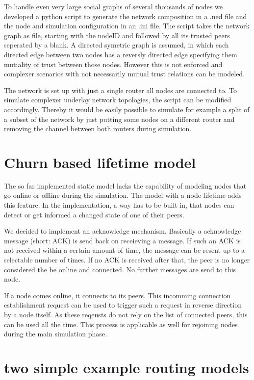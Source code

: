 To handle even very large social graphs of several thousands of nodes we developed a python script to generate the network composition in a .ned file and the node and simulation configuration in an .ini file. The script takes the network graph as file, starting with the nodeID and followed by all its trusted peers seperated by a blank. A directed symetric graph is assumed, in which each directed edge between two nodes has a reversly directed edge specifying them mutiality of trust between those nodes. However this is not enforced and complexer scenarios with not necessarily mutual trust relations can be modeled.

The network is set up with just a single router all nodes are connected to. To simulate complexer underlay network topologies, the script can be modified accordingly. Thereby it would be easily possible to simulate for example a split of a subset of the network by just putting some nodes on a different router and removing the channel between both routers during simulation.

\section{Churn based lifetime model}

The so far implemented static model lacks the capability of modeling nodes that go online or offline during the simulation. The model with a node lifetime adds this feature. In the implementation, a way has to be built in, that nodes can detect or get informed a changed state of one of their peers.

We decided to implement an acknowledge mechanism. Basically a acknowledge message (short: ACK) is send back on receieving a message. If such an ACK is not received within a certain amount of time, the message can be resent up to a selectable number of times. If no ACK is received after that, the peer is no longer considered the be online and connected. No further messages are send to this node.

If a node comes online, it connects to its peers. This incomming connection establishment request can be used to trigger such a request in reverse direction by a node itself. As these reqeusts do not rely on the list of connected peers, this can be used all the time. This process is applicable as well for rejoining nodes during the main simulation phase.

\section{two simple example routing models}

